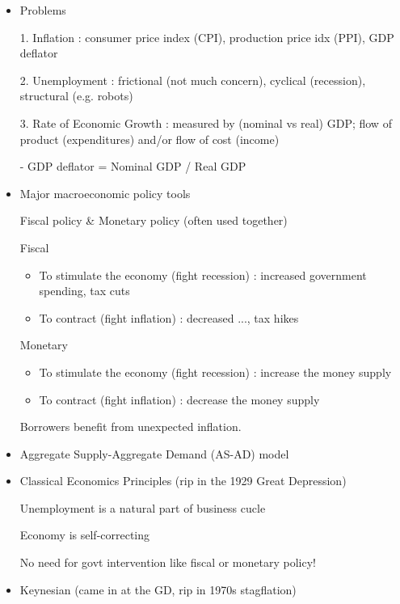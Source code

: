 \documentclass{article}
\begin{document}
\newcommand\independent{\protect\mathpalette{\protect\independenT}{\perp}}
\def\independenT#1#2{\mathrel{\rlap{$#1#2$}\mkern2mu{#1#2}}}


\begin{itemize}
	\item Problems
	
	1. Inflation : consumer price index (CPI), production price idx (PPI), GDP deflator

	2. Unemployment : frictional (not much concern), cyclical (recession), structural (e.g. robots)

	3. Rate of Economic Growth : measured by (nominal vs real) GDP; flow of product (expenditures) and/or flow of cost (income)

	- GDP deflator = Nominal GDP / Real GDP

	\item Major macroeconomic policy tools

	Fiscal policy \& Monetary policy (often used together)

	Fiscal
	\begin{itemize}
		\item To stimulate the economy (fight recession) : increased government spending, tax cuts
		\item To contract (fight inflation) : decreased ..., tax hikes
	\end{itemize}

	Monetary
	\begin{itemize}
		\item To stimulate the economy (fight recession) : increase the money supply
		\item To contract (fight inflation) : decrease the money supply
	\end{itemize}

	Borrowers benefit from unexpected inflation.

	\item Aggregate Supply-Aggregate Demand (AS-AD) model


	\item Classical Economics Principles (rip in the 1929 Great Depression)

	Unemployment is a natural part of business cucle

	Economy is self-correcting

	No need for govt intervention like fiscal or monetary policy!

	\item Keynesian (came in at the GD, rip in 1970s stagflation)


\end{itemize}
\end{document}

